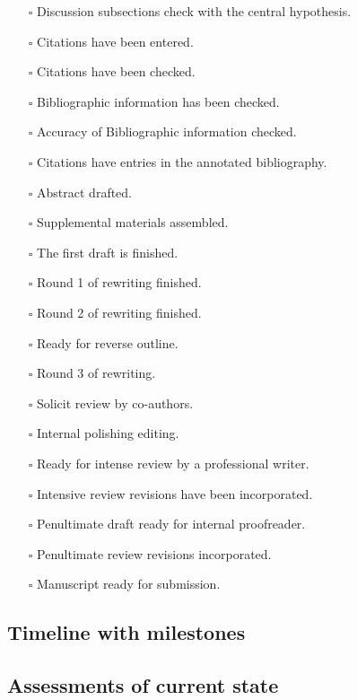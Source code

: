 \documentclass[11pt,letterpaper]{article}
\begin{document}
\begin{itemize}
\item[{$\square$}] Discussion subsections check with the central hypothesis.
\item[{$\square$}] Citations have been entered.
\item[{$\square$}] Citations have been checked.
\item[{$\square$}] Bibliographic information has been checked.
\item[{$\square$}] Accuracy of Bibliographic information checked.
\item[{$\square$}] Citations have entries in the annotated bibliography.
\item[{$\square$}] Abstract drafted.
\item[{$\square$}] Supplemental materials assembled.
\item[{$\square$}] The first draft is finished.
\item[{$\square$}] Round 1 of rewriting finished.
\item[{$\square$}] Round 2 of rewriting finished.
\item[{$\square$}] Ready for reverse outline.
\item[{$\square$}] Round 3 of rewriting.
\item[{$\square$}] Solicit review by co-authors.
\item[{$\square$}] Internal polishing editing.
\item[{$\square$}] Ready for intense review by a professional writer.
\item[{$\square$}] Intensive review revisions have been incorporated.
\item[{$\square$}] Penultimate draft ready for internal proofreader.
\item[{$\square$}] Penultimate review revisions incorporated.
\item[{$\square$}] Manuscript ready for submission.
\end{itemize}




\subsection{Timeline with milestones}
\label{sec:org5df709e}



\subsection{Assessments of current state}
\label{sec:org013c949}
\end{document}
